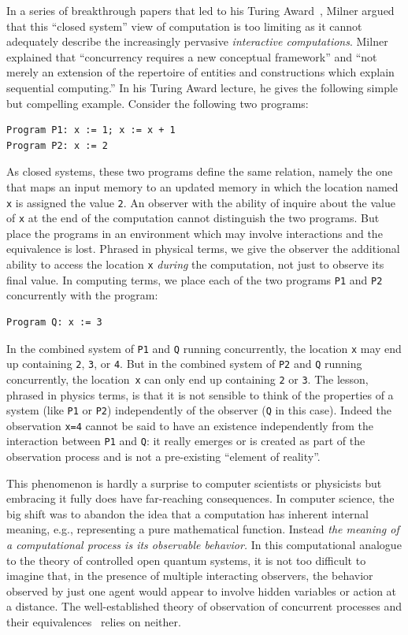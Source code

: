 \documentclass{article}
\theoremstyle{remark}
\begin{document}
In a series of breakthrough papers that led to his Turing
Award~\cite{Milner:1993:EIT:151233.151240}, Milner argued that this
``closed system'' view of computation is too limiting as it cannot
adequately describe the increasingly pervasive \emph{interactive
  computations}. Milner explained that ``concurrency requires a new
conceptual framework'' and ``not merely an extension of the repertoire
of entities and constructions which explain sequential computing.'' In
his Turing Award lecture, he gives the following simple but compelling
example. Consider the following two programs:
\begin{verbatim}
Program P1: x := 1; x := x + 1 
Program P2: x := 2
\end{verbatim}
As closed systems, these two programs define the same relation, namely
the one that maps an input memory to an updated memory in which the
location named \verb|x| is assigned the value \verb|2|. An observer
with the ability of inquire about the value of \verb|x| at the end of
the computation cannot distinguish the two programs. But place the
programs in an environment which may involve interactions and the
equivalence is lost. Phrased in physical terms, we give the observer the
additional ability to access the location \verb|x| \emph{during} the
computation, not just to observe its final value. In computing terms,
we place each of the two programs \verb|P1| and \verb|P2| concurrently
with the program:
\begin{verbatim}
Program Q: x := 3
\end{verbatim}
In the combined system of \verb|P1| and \verb|Q| running concurrently,
the location \verb|x| may end up containing \verb|2|, \verb|3|, or
\verb|4|. But in the combined system of \verb|P2| and \verb|Q| running
concurrently, the location~\verb|x| can only end up containing
\verb|2| or \verb|3|. The lesson, phrased in physics terms, is that it
is not sensible to think of the properties of a system (like \verb|P1|
or \verb|P2|) independently of the observer (\verb|Q| in this
case). Indeed the observation \verb|x=4| cannot be said to have an
existence independently from the interaction between \verb|P1| and
\verb|Q|: it really emerges or is created as part of the observation
process and is not a pre-existing ``element of reality''.

This phenomenon is hardly a surprise to computer scientists or
physicists but embracing it fully does have far-reaching
consequences. In computer science, the big shift was to abandon the
idea that a computation has inherent internal meaning, e.g.,
representing a pure mathematical function. Instead \emph{the meaning
  of a computational process is its observable behavior.} In this
computational analogue to the theory of controlled open quantum
systems, it is not too difficult to imagine that, in the presence of
multiple interacting observers, the behavior observed by just one
agent would appear to involve hidden variables or action at a
distance. The well-established theory of observation of concurrent
processes and their equivalences~\cite{Hennessy1989} relies on
neither.
\end{document}
